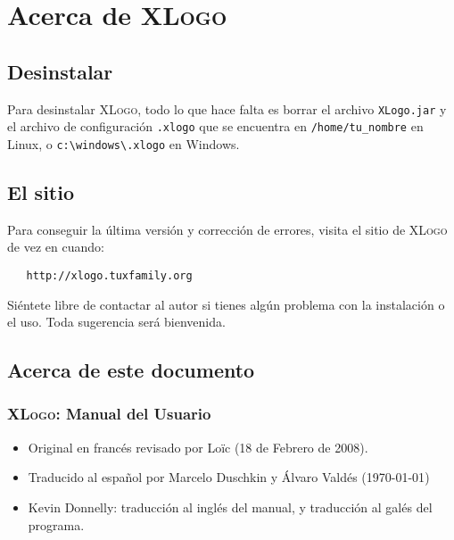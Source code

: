 \chapter{Acerca de \textsc{XLogo}}
   \label{Acerca-de-XLogo}

\section{Desinstalar}
   \label{Desinstalar}

Para desinstalar \textsc{XLogo}, todo lo que hace falta es borrar el archivo
\texttt{XLogo.jar} y el archivo de configuraci\'on \texttt{.xlogo} que
se encuentra en \texttt{/home/tu\_nombre} en Linux, o
\texttt{c:\textbackslash{}windows\textbackslash{}.xlogo}
en Windows.

\section{El sitio}
   \label{El-sitio}

Para conseguir la \'ultima versi\'on y correcci\'on de errores, visita el
sitio de \textsc{XLogo} de vez en cuando:
\begin{verbatim}
   http://xlogo.tuxfamily.org \end{verbatim}
Si\'entete libre de contactar al autor si tienes alg\'un problema con
la instalaci\'on o el uso. Toda sugerencia ser\'a bienvenida.


\section{Acerca de este documento}
   \label{Acerca-Documento}

\subsection*{\textsc{XLogo}: Manual del Usuario}

\begin{itemize}
   \item Original en franc\'es revisado por Lo\"ic (18 de Febrero de 2008).
   \item Traducido al espa\~nol por Marcelo Duschkin y \'Alvaro Vald\'es
      ({\today})
   \item Kevin Donnelly: traducci\'on al ingl\'es del manual, y traducci\'on
      al gal\'es del programa. %
\end{itemize}

